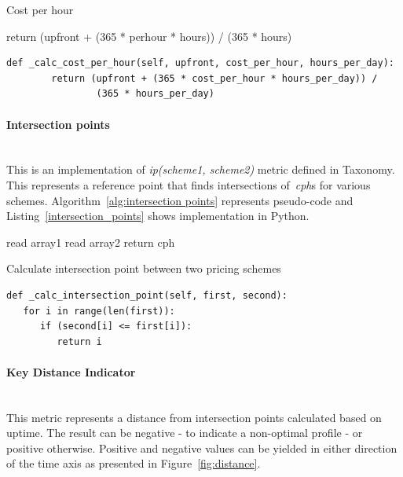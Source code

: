 \documentclass[]{final_report}
\newcommand{\myparagraph}[1]{\paragraph{#1}\mbox{}\\}
\begin{document}
\begin{algorithm}[H]
 \caption{Cost per hour}
 \label{alg:cost_per_hour}
 return (upfront + (365 * perhour * hours)) / (365 * hours)
\end{algorithm}

\begin{minipage}{\linewidth}
\begin{lstlisting}[label={cost_per_hour},caption={Cost per hour implementation in Python},frame=single] 
def _calc_cost_per_hour(self, upfront, cost_per_hour, hours_per_day):
        return (upfront + (365 * cost_per_hour * hours_per_day)) /
                (365 * hours_per_day)
\end{lstlisting}
\end{minipage}

\myparagraph{Intersection points}

This is an implementation of \textit{ip(scheme1, scheme2)} metric defined in Taxonomy. This represents a reference point that finds intersections of~\textit{cph}s for various schemes. Algorithm~\ref{alg:intersection points} represents pseudo-code and Listing~\ref{intersection_points} shows implementation in Python. 

\begin{algorithm}[H]
 \label{alg:intersection points}
 read array1\;
 read array2\;
  {
 	 {
 		return cph
 	}
 }
\caption{Calculate intersection point between two pricing schemes}
\end{algorithm}

\begin{minipage}{\linewidth}
\begin{lstlisting}[label={intersection_points},caption={Intersection point between various pricing schemes},frame=single] 
def _calc_intersection_point(self, first, second):
   for i in range(len(first)):
      if (second[i] <= first[i]):
         return i
\end{lstlisting}
\end{minipage}

\myparagraph{Key Distance Indicator}

This metric represents a distance from intersection points calculated based on uptime. The result can be negative - to indicate a non-optimal profile - or positive otherwise. Positive and negative values can be yielded in either direction of the time axis as presented in Figure~\ref{fig:distance}. 
\end{document}
